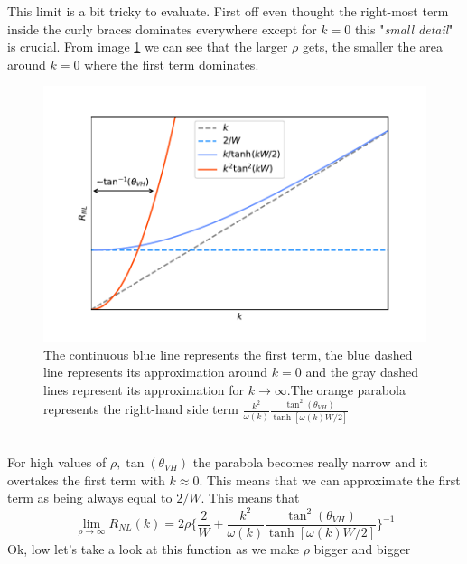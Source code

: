 This limit is a bit tricky to evaluate. First off even thought the right-most term inside the curly braces dominates everywhere except for $k=0$ this "\emph{small detail}" is crucial. From image \ref{fig:rho1} we can see that the larger $\rho$ gets, the smaller the area around $k=0$ where the first term dominates.
\begin{figure}[h!]
    \centering
    \includegraphics[width=\linewidth]{Immagini/rnl/rho1.pdf}
    \caption{The continuous blue line represents the first term, the blue dashed line represents its approximation around $k=0$ and the gray dashed lines represent its approximation for $k\to \infty$.\newline The orange parabola represents the right-hand side term $\frac {k^2}{\omega(k)}\frac{\tan^2(\theta_{VH})}{\tanh[\omega(k)W/2]}$}
    \label{fig:rho1}
\end{figure}\\
For high values of $\rho, \tan(\theta_{VH})$ the parabola becomes really narrow and it overtakes the first term with $k\approx 0$. This means that we can approximate the first term as being always equal to $2/W$. This means that
\begin{equation}
    \lim_{\rho\to\infty} R_{NL}(k)=2\rho
    \bigg\{
        \frac 2W+ \frac {k^2}{\omega(k)}\frac{\tan^2(\theta_{VH})}{\tanh[\omega(k)W/2]}    
    \bigg\}^{-1}
    \label{eq:rhotoinf}
\end{equation}
Ok, low let's take a look at this function as we make $\rho$ bigger and bigger
